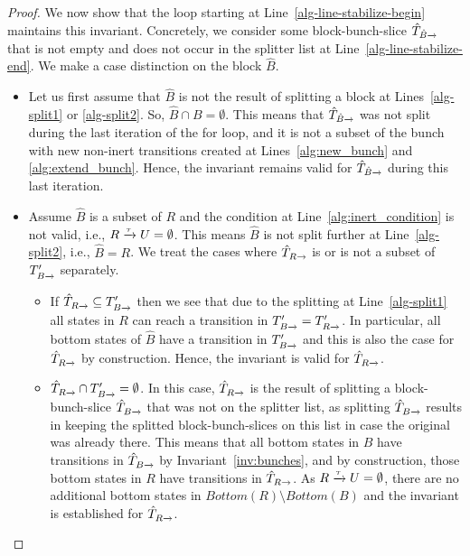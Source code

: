 \documentclass[a4paper,10pt]{article}
\theoremstyle{definition}
\theoremstyle{plain}
\newcommand{\pijl}[1]{\mathrel{\text{$\xrightarrow{\smash[t]{#1}}$}}}
\newcommand{\Bottom}{\mathit{Bottom}}
\begin{document}
\begin{proof}
We now show that the loop starting at Line~\ref{alg-line-stabilize-begin} maintains this invariant.
Concretely, we consider some block-bunch-slice $\hat{T}_{\smash[t]{\hat{B}}\pijl{}}$
that is not empty and does not occur in the splitter list at Line~\ref{alg-line-stabilize-end}.
We make a case distinction on the block $\hat{B}$.

\begin{itemize}
\item
	Let us first assume that $\hat{B}$ is not the result of splitting a block at Lines~\ref{alg-split1} or \ref{alg-split2}.
	So, $\hat{B} \cap B = \emptyset$.
	This means that $\hat{T}_{\smash[t]{\hat{B}}\pijl{}}$ was not split during the last iteration of the for loop,
	and it is not a subset of the bunch with new non-inert transitions created at Lines~\ref{alg:new_bunch} and \ref{alg:extend_bunch}.
	Hence, the invariant remains valid for $\hat{T}_{\smash[t]{\hat{B}}\pijl{}}$ during this last iteration.
\item
	Assume $\hat{B}$ is a subset of $R$ and the condition at Line~\ref{alg:inert_condition} is not valid,
	i.e., $R\pijl{\tau} U=\emptyset$.
	This means $\hat{B}$ is not split further at Line~\ref{alg-split2}, i.e., $\hat{B} = R$.
	We treat the cases where $\hat{T}_{R\pijl{}}$ is or is not a subset of $T'_{B\pijl{}}$ separately.
	\begin{itemize}
	\item	If $\hat{T}_{R\pijl{}}\subseteq T'_{B\pijl{}}$ then we see that due to the splitting at Line~\ref{alg-split1}
		all states in $R$ can reach a transition in $T'_{B\pijl{}} = T'_{R\pijl{}}$.
		In particular, all bottom states of $\hat{B}$ have a transition in $T'_{B\pijl{}}$
		and this is also the case for $\hat{T}_{R\pijl{}}$ by construction.
		Hence, the invariant is valid for $\hat{T}_{R\pijl{}}$.
	\item	$\hat{T}_{R\pijl{}}\cap T'_{B\pijl{}}=\emptyset$.
		In this case, $\hat{T}_{R\pijl{}}$ is the result of splitting a block-bunch-slice $\hat{T}_{B\pijl{}}$
		that was not on the splitter list,
		as splitting $\hat{T}_{B\pijl{}}$ results in keeping the splitted block-bunch-slices on this list
		in case the original was already there.
		This means that all bottom states in $B$ have transitions in $\hat{T}_{B\pijl{}}$ by Invariant~\ref{inv:bunches},
		and by construction, those bottom states in $R$ have transitions in $\hat{T}_{R\pijl{}}$.
		As $R\pijl{\tau} U=\emptyset$, there are no additional bottom states in $\Bottom(R) \setminus \Bottom(B)$
		and the invariant is established for $\hat{T}_{R\pijl{}}$.

\end{itemize}
\end{itemize}
\end{proof}
\end{document}
